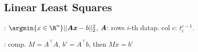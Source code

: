 \subsection{Linear Least Squares}
: $\argmin{x \in \R^n} ||\mat{A}\vec{x} - b||^2_2$, $\bm{A}$: rows $i$-th datap. col $c$: $t_i^{c - 1}$.

: comp. $M = A^\top A$, $b' = A^\top b$, then $Mx = b'$
